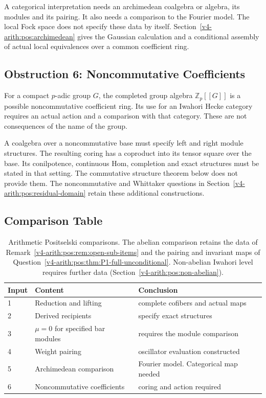 A categorical interpretation needs an archimedean coalgebra or
algebra, its modules and its pairing. It also needs a
comparison to the Fourier model.
The local Fock space does not specify these data by itself.
Section~\ref{v4-arith:pos:archimedean} gives the Gaussian
calculation and a conditional assembly of actual local
equivalences over a common coefficient ring.

\subsection{Obstruction 6: Noncommutative Coefficients}
\label{v4-arith:pos:att-6-noncommutative}

For a compact \(p\)-adic group \(G\), the completed group algebra
\(\mathbb Z_p[[G]]\) is a possible noncommutative coefficient ring.
Its use for an Iwahori Hecke category requires an actual action
and a comparison with that category. These are not consequences
of the name of the group.

A coalgebra over a noncommutative base must specify left and
right module structures. The resulting coring has a coproduct
into its tensor square over the base.
Its conilpotence, continuous Hom, completion and exact structures
must be stated in that setting. The commutative structure theorem
below does not provide them. The noncommutative and Whittaker
questions in Section~\ref{v4-arith:pos:residual-domain} retain
these additional constructions.

\subsection{Comparison Table}
\label{v4-arith:pos:table-summary}

\begin{table}[h]
\centering
\small
\begin{tabular}{@{}p{.10\linewidth}|p{.34\linewidth}|p{.47\linewidth}@{}}
Input & Content & Conclusion \\
\hline
1 & Reduction and lifting & complete cofibers and actual maps \\
2 & Derived recipients & specify exact structures \\
3 & \(\mu=0\) for specified bar modules & requires the module comparison \\
4 & Weight pairing & oscillator evaluation constructed \\
5 & Archimedean comparison & Fourier model. Categorical map needed \\
6 & Noncommutative coefficients & coring and action required \\
\end{tabular}
\caption{Arithmetic Positselski comparisons. The abelian comparison retains
 the data of Remark~\ref{v4-arith:pos:rem:open-sub-items}
 and the pairing and invariant maps of
 Question~\ref{v4-arith:pos:thm:P1-full-unconditional}.
 Non-abelian Iwahori level requires further data
 (Section~\ref{v4-arith:pos:non-abelian}).}
\label{v4-arith:pos:tab:table}
\end{table}

